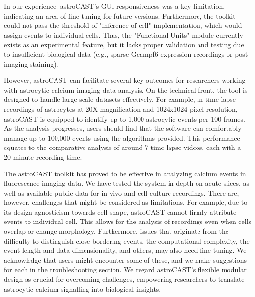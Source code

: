 In our experience, astroCAST's \ac{GUI} responsiveness was a key limitation, indicating an area of fine-tuning for future versions. Furthermore, the toolkit could not pass the threshold of "inference-of-cell" implementation, which would assign events to individual cells. Thus, the "Functional Units" module currently exists as an experimental feature, but it lacks proper validation and testing due to insufficient biological data (e.g., sparse Gcampf6 expression recordings or post-imaging staining).

However, \ac{astroCAST} can facilitate several key outcomes for researchers working with astrocytic calcium imaging data analysis. On the technical front, the tool is designed to handle large-scale datasets effectively. For  example, in time-lapse recordings of astrocytes at 20X magnification and 1024x1024 pixel resolution, astroCAST is equipped to identify up to 1,000 astrocytic events per 100 frames. As the analysis progresses, users should find that the software can comfortably manage up to 100,000 events using the algorithms provided. This performance equates to the comparative analysis of around 7 time-lapse videos, each with a 20-minute recording time.

The astroCAST toolkit has proved to be effective in analyzing calcium events in fluorescence imaging data. We have tested the system in depth on acute slices, as well as available public data for in-vivo and cell  culture recordings. There are, however, challenges that might be considered as limitations. For example, due to its design agnosticism towards cell shape, astroCAST cannot firmly attribute events to individual cell. This allows for the analysis of recordings even when cells overlap or change morphology. Furthermore, issues that originate from the difficulty to distinguish close bordering events, the computational complexity, the event length and data dimensionality, and others, may also need fine-tuning. We acknowledge that users might encounter some of these, and we make suggestions for each in the troubleshooting section. We regard astroCAST's flexible modular design as crucial for overcoming challenges, empowering researchers to translate astrocytic calcium signalling into biological insights.

